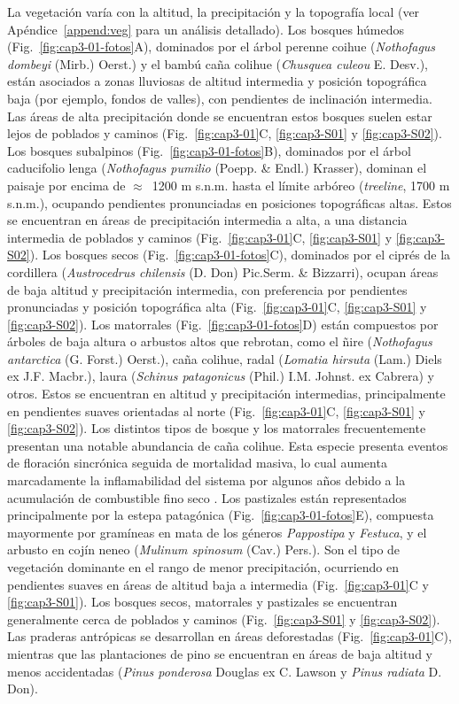 La vegetación varía con la altitud, la precipitación y la topografía local (ver Apéndice~\ref{append:veg} para un análisis detallado). Los bosques húmedos (Fig.~\ref{fig:cap3-01-fotos}A), dominados por el árbol perenne coihue (\textit{Nothofagus dombeyi} (Mirb.) Oerst.) y el bambú caña colihue (\textit{Chusquea culeou} E. Desv.), están asociados a zonas lluviosas de altitud intermedia y posición topográfica baja (por ejemplo, fondos de valles), con pendientes de inclinación intermedia. Las áreas de alta precipitación donde se encuentran estos bosques suelen estar lejos de poblados y caminos (Fig.~\ref{fig:cap3-01}C, \ref{fig:cap3-S01} y \ref{fig:cap3-S02}). Los bosques subalpinos (Fig.~\ref{fig:cap3-01-fotos}B), dominados por el árbol caducifolio lenga (\textit{Nothofagus pumilio} (Poepp. \& Endl.) Krasser), dominan el paisaje por encima de $\approx$~1200 m s.n.m. hasta el límite arbóreo (\textit{treeline}, 1700 m s.n.m.), ocupando pendientes pronunciadas en posiciones topográficas altas. Estos se encuentran en áreas de precipitación intermedia a alta, a una distancia intermedia de poblados y caminos (Fig.~\ref{fig:cap3-01}C, \ref{fig:cap3-S01} y \ref{fig:cap3-S02}). Los bosques secos (Fig.~\ref{fig:cap3-01-fotos}C), dominados por el ciprés de la cordillera (\textit{Austrocedrus chilensis} (D. Don) Pic.Serm. \& Bizzarri), ocupan áreas de baja altitud y precipitación intermedia, con preferencia por pendientes pronunciadas y posición topográfica alta (Fig.~\ref{fig:cap3-01}C, \ref{fig:cap3-S01} y \ref{fig:cap3-S02}). Los matorrales (Fig.~\ref{fig:cap3-01-fotos}D) están compuestos por árboles de baja altura o arbustos altos que rebrotan, como el ñire (\textit{Nothofagus antarctica} (G. Forst.) Oerst.), caña colihue, radal (\textit{Lomatia hirsuta} (Lam.) Diels ex J.F. Macbr.), laura (\textit{Schinus patagonicus} (Phil.) I.M. Johnst. ex Cabrera) y otros. Estos se encuentran en altitud y precipitación intermedias, principalmente en pendientes suaves orientadas al norte (Fig.~\ref{fig:cap3-01}C, \ref{fig:cap3-S01} y \ref{fig:cap3-S02}). Los distintos tipos de bosque y los matorrales frecuentemente presentan una notable abundancia de caña colihue. Esta especie presenta eventos de floración sincrónica seguida de mortalidad masiva, lo cual aumenta marcadamente la inflamabilidad del sistema por algunos años debido a la acumulación de combustible fino seco \citep{veblen_fire_2003}. Los pastizales están representados principalmente por la estepa patagónica (Fig.~\ref{fig:cap3-01-fotos}E), compuesta mayormente por gramíneas en mata de los géneros \textit{Pappostipa} y \textit{Festuca}, y el arbusto en cojín neneo (\textit{Mulinum spinosum} (Cav.) Pers.). Son el tipo de vegetación dominante en el rango de menor precipitación, ocurriendo en pendientes suaves en áreas de altitud baja a intermedia (Fig.~\ref{fig:cap3-01}C y \ref{fig:cap3-S01}). Los bosques secos, matorrales y pastizales se encuentran generalmente cerca de poblados y caminos (Fig.~\ref{fig:cap3-S01} y \ref{fig:cap3-S02}). Las praderas antrópicas se desarrollan en áreas deforestadas (Fig.~\ref{fig:cap3-01}C), mientras que las plantaciones de pino se encuentran en áreas de baja altitud y menos accidentadas (\textit{Pinus ponderosa} Douglas ex C. Lawson y \textit{Pinus radiata} D. Don).

